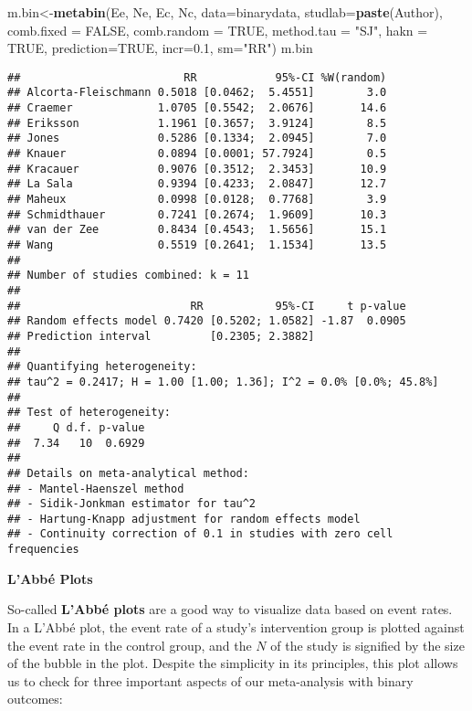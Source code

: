 \documentclass[]{book}
\newenvironment{Shaded}{\begin{snugshade}}{\end{snugshade}}
\newcommand{\KeywordTok}[1]{\textcolor[rgb]{0.13,0.29,0.53}{\textbf{#1}}}
\newcommand{\DataTypeTok}[1]{\textcolor[rgb]{0.13,0.29,0.53}{#1}}
\newcommand{\FloatTok}[1]{\textcolor[rgb]{0.00,0.00,0.81}{#1}}
\newcommand{\StringTok}[1]{\textcolor[rgb]{0.31,0.60,0.02}{#1}}
\newcommand{\OtherTok}[1]{\textcolor[rgb]{0.56,0.35,0.01}{#1}}
\newcommand{\NormalTok}[1]{#1}
\theoremstyle{definition}
\theoremstyle{definition}
\theoremstyle{definition}
\theoremstyle{remark}
\begin{document}
\begin{Shaded}
\begin{Highlighting}[]
\NormalTok{m.bin<-}\KeywordTok{metabin}\NormalTok{(Ee,}
\NormalTok{        Ne,}
\NormalTok{        Ec,}
\NormalTok{        Nc,}
        \DataTypeTok{data=}\NormalTok{binarydata,}
        \DataTypeTok{studlab=}\KeywordTok{paste}\NormalTok{(Author),}
        \DataTypeTok{comb.fixed =} \OtherTok{FALSE}\NormalTok{,}
        \DataTypeTok{comb.random =} \OtherTok{TRUE}\NormalTok{,}
        \DataTypeTok{method.tau =} \StringTok{"SJ"}\NormalTok{,}
        \DataTypeTok{hakn =} \OtherTok{TRUE}\NormalTok{,}
        \DataTypeTok{prediction=}\OtherTok{TRUE}\NormalTok{,}
        \DataTypeTok{incr=}\FloatTok{0.1}\NormalTok{,}
        \DataTypeTok{sm=}\StringTok{"RR"}\NormalTok{)}
\NormalTok{m.bin}
\end{Highlighting}
\end{Shaded}

\begin{verbatim}
##                         RR            95%-CI %W(random)
## Alcorta-Fleischmann 0.5018 [0.0462;  5.4551]        3.0
## Craemer             1.0705 [0.5542;  2.0676]       14.6
## Eriksson            1.1961 [0.3657;  3.9124]        8.5
## Jones               0.5286 [0.1334;  2.0945]        7.0
## Knauer              0.0894 [0.0001; 57.7924]        0.5
## Kracauer            0.9076 [0.3512;  2.3453]       10.9
## La Sala             0.9394 [0.4233;  2.0847]       12.7
## Maheux              0.0998 [0.0128;  0.7768]        3.9
## Schmidthauer        0.7241 [0.2674;  1.9609]       10.3
## van der Zee         0.8434 [0.4543;  1.5656]       15.1
## Wang                0.5519 [0.2641;  1.1534]       13.5
## 
## Number of studies combined: k = 11
## 
##                          RR           95%-CI     t p-value
## Random effects model 0.7420 [0.5202; 1.0582] -1.87  0.0905
## Prediction interval         [0.2305; 2.3882]              
## 
## Quantifying heterogeneity:
## tau^2 = 0.2417; H = 1.00 [1.00; 1.36]; I^2 = 0.0% [0.0%; 45.8%]
## 
## Test of heterogeneity:
##     Q d.f. p-value
##  7.34   10  0.6929
## 
## Details on meta-analytical method:
## - Mantel-Haenszel method
## - Sidik-Jonkman estimator for tau^2
## - Hartung-Knapp adjustment for random effects model
## - Continuity correction of 0.1 in studies with zero cell frequencies
\end{verbatim}

\textbf{L'Abbé Plots}

So-called \textbf{L'Abbé plots} \citep{labbe} are a good way to
visualize data based on event rates. In a L'Abbé plot, the event rate of
a study's intervention group is plotted against the event rate in the
control group, and the \(N\) of the study is signified by the size of
the bubble in the plot. Despite the simplicity in its principles, this
plot allows us to check for three important aspects of our meta-analysis
with binary outcomes:
\end{document}
